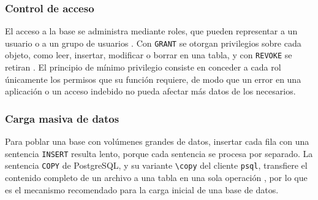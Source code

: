 \subsubsection{Control de acceso}

El acceso a la base se administra mediante roles, que pueden representar a un usuario o a un grupo de usuarios \parencite{postgres_roles}. Con \texttt{GRANT} se otorgan privilegios sobre cada objeto, como leer, insertar, modificar o borrar en una tabla, y con \texttt{REVOKE} se retiran \parencite{postgres_privileges}. El principio de mínimo privilegio consiste en conceder a cada rol únicamente los permisos que su función requiere, de modo que un error en una aplicación o un acceso indebido no pueda afectar más datos de los necesarios.

\subsubsection{Carga masiva de datos}

Para poblar una base con volúmenes grandes de datos, insertar cada fila con una sentencia \texttt{INSERT} resulta lento, porque cada sentencia se procesa por separado. La sentencia \texttt{COPY} de PostgreSQL, y su variante \texttt{\textbackslash copy} del cliente \texttt{psql}, transfiere el contenido completo de un archivo a una tabla en una sola operación \parencite{postgres_copy}, por lo que es el mecanismo recomendado para la carga inicial de una base de datos.
